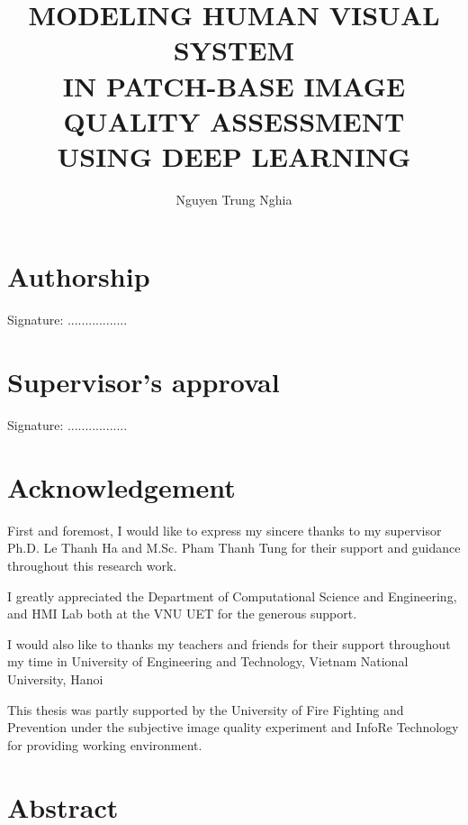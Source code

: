 \documentclass[a4paper, 13pt, oneside]{Thesis}
\title{MODELING HUMAN VISUAL SYSTEM \\ IN PATCH-BASE IMAGE QUALITY ASSESSMENT \\ USING DEEP LEARNING}	%
\author{Nguyen Trung Nghia}			%
\begin{document}
%
\maketitle

%
\chapter*{Authorship}

\emph{
}

\bigskip
Signature: .................

%
\chapter*{Supervisor’s approval}
\emph{
}

\bigskip
Signature: .................


\chapter*{Acknowledgement}

First and foremost, I would like to express my sincere thanks to my supervisor Ph.D. Le Thanh Ha and M.Sc. Pham Thanh Tung for their support and guidance throughout this research work.

I greatly appreciated the Department of Computational Science and Engineering, and HMI Lab both at the VNU UET for the generous support.

I would also like to thanks my teachers and friends for their support throughout my time in
University of Engineering and Technology, Vietnam National University, Hanoi

This thesis was partly supported by the University of Fire Fighting and Prevention under the subjective image quality experiment and InfoRe Technology for providing working environment. 


\chapter*{Abstract}
\end{document}
